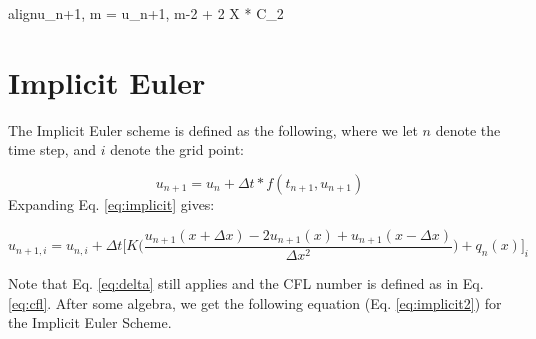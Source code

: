 \documentclass[10pt, letter, showtrims]{extarticle}
\newcommand{\boxedeq}[2]{\begin{empheq}[box={\fboxsep=6pt\fbox}]{align}\label{#1}#2\end{empheq}}
\begin{document}
		\boxedeq{eq:explicitbc2}{u_{n+1, m} = u_{n+1, m-2} + 2 \Delta X * C_{2}}		
		
		\noindent
		\section{Implicit Euler}
		
		\noindent
		The Implicit Euler scheme is defined as the following, where we let $n$ denote the time step, and $i$ denote the grid point:
		
		\begin{equation}
		\label{eq:implicit}
			u_{n+1} = u_{n} + \Delta t * f(t_{n+1}, u_{n+1})
		\end{equation}
%		
%		
%		
		\noindent
		Expanding Eq. \ref{eq:implicit} gives:
		
		
		\begin{equation}
			u_{n+1,i} = u_{n,i} + \Delta t \big[ K \big(\frac{u_{n+1}(x + \Delta x) - 2 u_{n+1} (x) + u_{n+1} (x - \Delta x)}{\Delta x^{2}} \big) + q_{n}(x)\big]_{i}
		\end{equation}
	
		\vspace{1em}
		
		\noindent
		Note that Eq. \ref{eq:delta} still applies and the CFL number is defined as in Eq. \ref{eq:cfl}. After some algebra, we get the following equation (Eq. \ref{eq:implicit2}) for the Implicit Euler Scheme.
		
\end{document}
